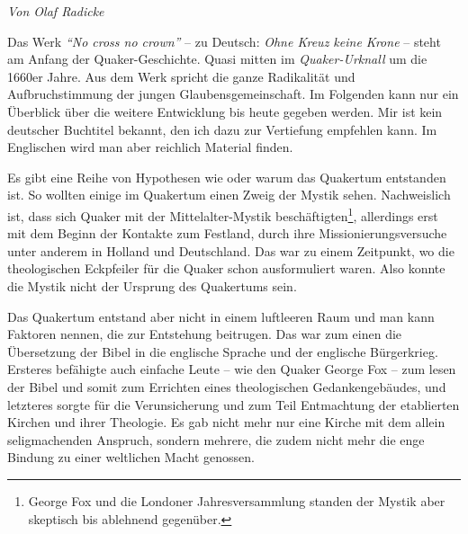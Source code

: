 


\begin{flushright}
\begin{footnotesize}
\textit{Von Olaf Radicke}
\end{footnotesize}
\end{flushright}
\smallskip

Das Werk \textit{"`No cross no crown"'} -- zu Deutsch: \textit{Ohne Kreuz keine
Krone} --
steht am Anfang der Quaker-Geschichte. Quasi mitten im
\textit{Quaker-Urknall}
um die 1660er Jahre. Aus dem Werk spricht die ganze Radikalität und
Aufbruchstimmung der jungen Glaubensgemeinschaft. Im Folgenden kann nur ein
Überblick über die weitere Entwicklung bis heute gegeben werden. Mir ist kein
deutscher Buchtitel bekannt, den ich dazu zur Vertiefung empfehlen kann. Im
Englischen wird man aber reichlich Material finden.

\medskip

Es gibt eine Reihe von Hypothesen wie oder warum das Quakertum
entstanden ist.
So
wollten einige im Quakertum einen Zweig der Mystik sehen.
Nachweislich ist, dass
sich Quaker mit der Mittelalter-Mystik beschäftigten\footnote{George Fox und die
Londoner Jahresversammlung standen der Mystik aber skeptisch bis ablehnend
gegenüber.}, allerdings erst mit dem
Beginn der Kontakte zum Festland, durch ihre Missionierungsversuche
 unter
anderem in Holland und Deutschland. Das war zu einem Zeitpunkt, wo die
theologischen Eckpfeiler für die Quaker schon ausformuliert waren. Also konnte
die Mystik nicht der Ursprung des Quakertums sein.

\medskip

Das Quakertum entstand aber nicht in einem luftleeren Raum und man kann Faktoren
nennen,
die zur Entstehung beitrugen. Das war zum einen die Übersetzung der Bibel
in die englische Sprache und der englische Bürgerkrieg. Ersteres befähigte auch
einfache Leute -- wie den Quaker George Fox -- zum
lesen der Bibel und somit zum
Errichten eines theologischen Gedankengebäudes, und letzteres sorgte für die
Verunsicherung und zum Teil Entmachtung der etablierten Kirchen
 und ihrer
Theologie. Es gab nicht mehr nur eine Kirche mit dem allein seligmachenden
Anspruch, sondern mehrere, die zudem nicht mehr die enge Bindung zu einer
weltlichen Macht genossen.

\medskip

